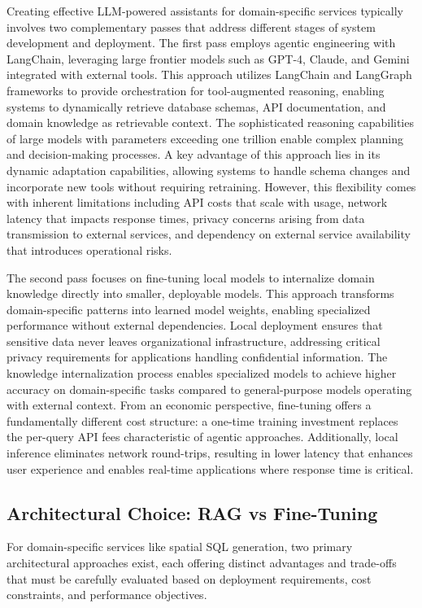 Creating effective LLM-powered assistants for domain-specific services typically involves two complementary passes that address different stages of system development and deployment. The first pass employs agentic engineering with LangChain, leveraging large frontier models such as GPT-4, Claude, and Gemini integrated with external tools. This approach utilizes LangChain and LangGraph frameworks to provide orchestration for tool-augmented reasoning, enabling systems to dynamically retrieve database schemas, API documentation, and domain knowledge as retrievable context. The sophisticated reasoning capabilities of large models with parameters exceeding one trillion enable complex planning and decision-making processes. A key advantage of this approach lies in its dynamic adaptation capabilities, allowing systems to handle schema changes and incorporate new tools without requiring retraining. However, this flexibility comes with inherent limitations including API costs that scale with usage, network latency that impacts response times, privacy concerns arising from data transmission to external services, and dependency on external service availability that introduces operational risks.

The second pass focuses on fine-tuning local models to internalize domain knowledge directly into smaller, deployable models. This approach transforms domain-specific patterns into learned model weights, enabling specialized performance without external dependencies. Local deployment ensures that sensitive data never leaves organizational infrastructure, addressing critical privacy requirements for applications handling confidential information. The knowledge internalization process enables specialized models to achieve higher accuracy on domain-specific tasks compared to general-purpose models operating with external context. From an economic perspective, fine-tuning offers a fundamentally different cost structure: a one-time training investment replaces the per-query API fees characteristic of agentic approaches. Additionally, local inference eliminates network round-trips, resulting in lower latency that enhances user experience and enables real-time applications where response time is critical.

\subsection{Architectural Choice: RAG vs Fine-Tuning}

For domain-specific services like spatial SQL generation, two primary architectural approaches exist, each offering distinct advantages and trade-offs that must be carefully evaluated based on deployment requirements, cost constraints, and performance objectives.

